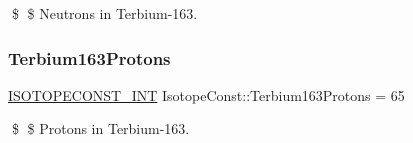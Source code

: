 \$ \$ Neutrons in Terbium-\/163. \mbox{\label{group___isotope_const-_terbium-_tb163_gaf55845c00f04eb651138c9bc7459757a}} 
\subsubsection{\texorpdfstring{Terbium163\+Protons}{Terbium163Protons}}
{\footnotesize\ttfamily \mbox{\hyperlink{group___isotope_const-_macros_ga5f18360b3e99483a35c32d789e62621c}{I\+S\+O\+T\+O\+P\+E\+C\+O\+N\+S\+T\+\_\+\+I\+NT}} Isotope\+Const\+::\+Terbium163\+Protons = 65}

\$ \$ Protons in Terbium-\/163. 